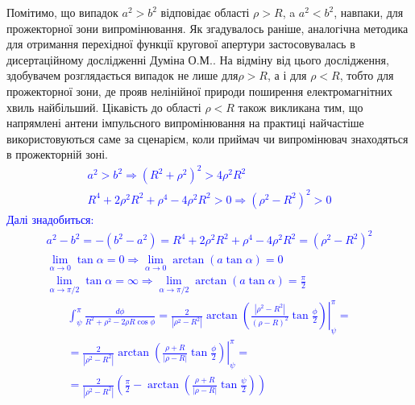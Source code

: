 Помітимо, що випадок $ a^2 > b^2 $ відповідає області $ \rho > R $, a 
$ a^2 < b^2 $, навпаки, для прожекторної зони випромінювання. Як 
згадувалось раніше, аналогічна методика для отримання перехідної функції 
кругової апертури застосовувалась в дисертаційному дослідженні Думіна О.М.. 
На відміну від цього дослідження, здобувачем розглядається випадок не лише 
для$ \rho > R $, а і для $ \rho < R $, тобто для прожекторної зони, де 
прояв нелінійної природи поширення електромагнітних хвиль найбільший. 
Цікавість до області $ \rho < R $ також викликана тим, що напрямлені 
антени імпульсного випромінювання на практиці найчастіше використовуються 
саме за сценарієм, коли приймач чи випромінювач знаходяться в прожекторній 
зоні.
%
\textcolor{blue}{ \begin{equation*} \begin{aligned}
a^2 > b^2  \Rightarrow  
\left( R^2 + \rho^2 \right)^2 > 4 \rho^2 R^2 \\
R^4 + 2 \rho^2 R^2 + \rho^4 - 4 \rho^2 R^2 > 0 \Rightarrow 
\left( \rho^2 - R^2 \right)^2 > 0
\end{aligned} \end{equation*} }
%
\textcolor{blue}{ Далі знадобиться: }
%
\textcolor{blue}{ \begin{equation*} \begin{aligned}
a^2 - b^2 = - \left( b^2 - a^2 \right) = 
R^4 + 2 \rho^2 R^2 + \rho^4 - 4 \rho^2 R^2 = \left( \rho^2 - R^2 \right)^2 \\
\lim_{\alpha \to 0} \tan{\alpha} = 0 \Rightarrow
\lim_{\alpha \to 0} \arctan \left( a \tan{\alpha} \right) = 0 \\ 
\lim_{\alpha \to \pi/2} \tan{\alpha} = \infty \Rightarrow
\lim_{\alpha \to \pi/2} \arctan \left( a \tan{\alpha} \right) = \frac{\pi}{2}
\end{aligned} \end{equation*} }
%
\textcolor{blue}{ \begin{equation*} \begin{aligned}
\int_{\psi}^{\pi} \frac{d \phi}{R^2 + \rho^2 - 2 \rho R \cos \phi} =
\left. \frac{2}{ |\rho^2 - R^2| } \arctan \left( \frac{ |\rho^2 - R^2| }
{\left( \rho - R \right)^2} \tan \frac{\phi}{2} \right)
\right|_{\psi}^{\pi} = \\ = \frac{2}{ |\rho^2 - R^2| } \left.
\arctan \left( \frac{\rho + R}{ |\rho - R| } \tan \frac{\phi}{2} \right)
\right|_{\psi}^{\pi} = \\ = \frac{2}{ |\rho^2 - R^2| } \left( \frac{\pi}{2} -
\arctan \left( \frac{\rho + R}{ |\rho - R| } \tan \frac{\psi}{2} \right) \right)
\end{aligned} \end{equation*} }
